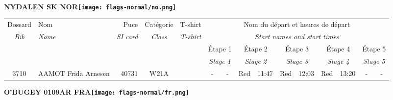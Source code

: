 \documentclass{report}
\begin{document}
\newpage
  \Huge \centering \bfseries NYDALEN SK  NOR\normalfont \footnotesize \sffamily \hfill \texttt{[image: flags-normal/no.png]} \newline 
  \begin{longtable}{|c|l|r|c|c|*{5}{cc|}}
    Dossard & Nom  & Puce    & Catégorie & T-shirt & \multicolumn{10}{c|}{Nom du départ et heures de départ} \\
    \itshape Bib     & \itshape Name & \itshape SI card & \itshape Class  & \itshape  T-shirt  & \multicolumn{10}{c|}{\itshape Start names and start times} \\
    \hline
    & & & & & \multicolumn{2}{c|}{Étape 1} & \multicolumn{2}{c|}{Étape 2} & \multicolumn{2}{c|}{Étape 3} & \multicolumn{2}{c|}{Étape 4} & \multicolumn{2}{c|}{Étape 5} \\
    & & & & & \multicolumn{2}{c|}{\itshape Stage 1} & \multicolumn{2}{c|}{\itshape Stage 2} & \multicolumn{2}{c|}{\itshape Stage 3} & \multicolumn{2}{c|}{\itshape Stage 4} & \multicolumn{2}{c|}{\itshape Stage 5} \\
    \hline
    3710 & AAMOT Frida Arnesen & 40731 & W21A &   & - &  - & Red & 11:47 & Red & 12:03 & Red & 13:20 & - &  -\\
  \end{longtable}
\newpage
  \Huge \centering \bfseries O'BUGEY 0109AR FRA\normalfont \footnotesize \sffamily \hfill \texttt{[image: flags-normal/fr.png]} \newline 
\end{document}
